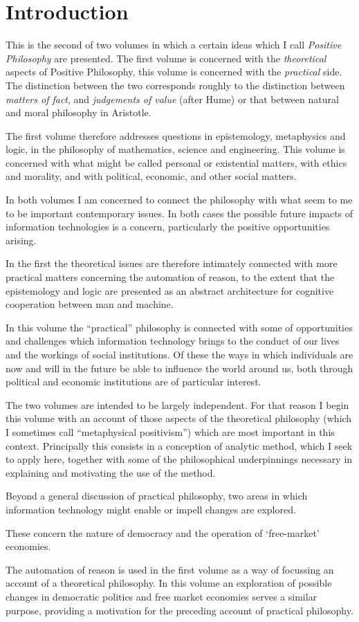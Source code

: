 \mainmatter
\chapter{Introduction}

This is the second of two volumes in which a certain ideas which I
call \emph{Positive Philosophy} are presented.
The first volume \cite{rbjb004} is concerned with the
\emph{theoretical} aspects of Positive Philosophy, this volume is
concerned with the \emph{practical} side. 
The distinction between the two corresponds roughly to the distinction
between \emph{matters of fact}, and \emph{judgements of value} (after Hume) or that
between natural and moral philosophy in Aristotle.

The first volume therefore addresses questions in epistemology,
metaphysics and logic, in the philosophy of mathematics, science and
engineering.
This volume is concerned with what might be called personal or
existential matters, with ethics and morality, and with political,
economic, and other social matters.

In both volumes I am concerned to connect the philosophy with
what seem to me to be important contemporary issues.
In both cases the possible future impacts of information technologies is
a concern, particularly the positive opportunities arising.

In the first the theoretical issues are therefore intimately connected
with more practical matters concerning the automation of reason,
to the extent that the epistemology and logic are presented as an
abstract architecture for cognitive cooperation between man and
machine.

In this volume the ``practical'' philosophy is connected with some of
opportunities and challenges which information technology brings to
the conduct of our lives and the workings of social institutions.
Of these the ways in which individuals are now and will in the future
be able to influence the world around us, both through political and
economic institutions are of particular interest.

The two volumes are intended to be largely independent.
For that reason I begin this volume with an account of those aspects of the
theoretical philosophy (which I sometimes call ``metaphysical
positivism'') which are most important in this context.
Principally this consists in a conception of analytic method, which I
seek to apply here, together with some of the philosophical
underpinnings necessary in explaining and motivating the use of the
method. 

Beyond a general discussion of practical philosophy, two areas in
which information technology might enable or impell changes are
explored.

These concern the nature of democracy and the operation of `free-market'
economies.

The automation of reason is used in the first volume as a way of
focussing an account of a theoretical philosophy.
In this volume an exploration of possible changes in democratic
politics and free market economies serves a similar purpose, providing
a motivation for the preceding account of practical philosophy.
